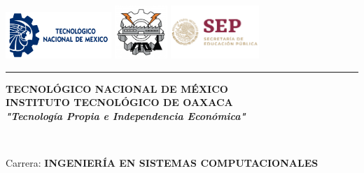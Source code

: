 \begin{titlepage}

    
    \begin{center}
    \includegraphics[width=0.3\textwidth]{images/logo-tecnm}\hspace{0.3in}
    \includegraphics[width=0.15\textwidth]{images/logo-ito}\hspace{0.3in}
    \includegraphics[width=0.25\textwidth]{images/logo-sep}
    
    \rule[1cm]{\textwidth}{3pt}
    
    \vspace{-1cm}
    {\Large
    \textbf{TECNOLÓGICO NACIONAL DE MÉXICO}\\[0.5cm]
	\LARGE
    \textbf{INSTITUTO TECNOLÓGICO DE OAXACA}\\[0.5cm]
	\normalsize
	\textbf{\textit{"Tecnología Propia e Independencia Económica"}}
	}
	
    \vspace{1cm}
    \LARGE
    \underline{\textbf{\myAsignature}} \\
    \small
    \myClave

    \vspace{1cm}
    \large
    Carrera: \textbf{INGENIERÍA EN SISTEMAS COMPUTACIONALES}
    

\end{center}
\end{titlepage}
